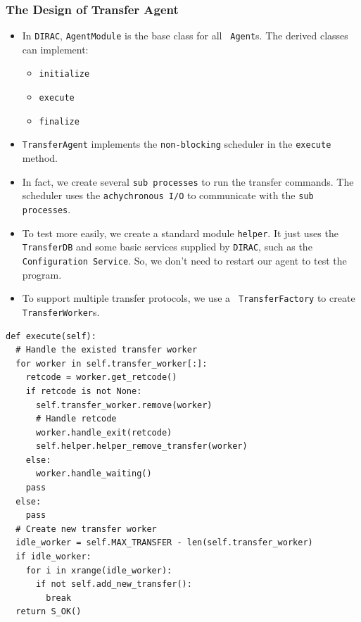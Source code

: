 \begin{frame}
    \frametitle{The Design of Transfer Agent}
    \begin{itemize}
        \item In {\tt DIRAC}, {\tt AgentModule} is the base class for all {\tt
            Agent}s. The derived classes can implement:
        \begin{itemize}
            \item {\tt initialize}
            \item {\tt execute}
            \item {\tt finalize}
        \end{itemize}
        \item {\tt TransferAgent} implements the {\tt non-blocking}
              scheduler in the {\tt execute} method.
        \item In fact, we create several {\tt sub processes} to run the 
                transfer commands. The scheduler uses the {\tt achychronous I/O}
                to communicate with the {\tt sub processes}.
        \item To test more easily, we create a standard module {\tt helper}.
              It just uses the {\tt TransferDB} and some basic services supplied
              by {\tt DIRAC}, such as the {\tt Configuration Service}.
              So, we don't need to restart our agent to test the program.
        \item To support multiple transfer protocols, we use a {\tt
                TransferFactory} to create {\tt TransferWorker}s.
    \end{itemize}
\end{frame}

\newsavebox{\TransferAgentExecute}
\begin{lrbox}{\TransferAgentExecute}
\begin{lstlisting}
def execute(self):
  # Handle the existed transfer worker
  for worker in self.transfer_worker[:]:
    retcode = worker.get_retcode()
    if retcode is not None:
      self.transfer_worker.remove(worker)
      # Handle retcode
      worker.handle_exit(retcode)
      self.helper.helper_remove_transfer(worker)
    else:
      worker.handle_waiting()
    pass
  else:
    pass
  # Create new transfer worker
  idle_worker = self.MAX_TRANSFER - len(self.transfer_worker)
  if idle_worker:
    for i in xrange(idle_worker):
      if not self.add_new_transfer():
        break
  return S_OK()
\end{lstlisting}
\end{lrbox}

